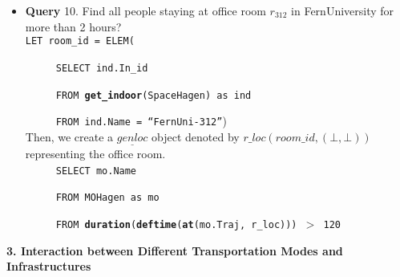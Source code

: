 \begin{itemize}
 \item \textbf{Query} 10. Find all people staying at office room $r_{312}$ in FernUniversity for more than 2 hours? \\

\texttt{LET room\_id = ELEM(} 

$\hspace{1cm}$ \texttt{SELECT ind.In\_id}

$\hspace{1cm}$ \texttt{FROM \textbf{get\_indoor}(SpaceHagen) as ind}

$\hspace{1cm}$ \texttt{FROM ind.Name = ``FernUni-312''}) \\

Then, we create a $\underline{genloc}$ object denoted by $r\_loc(room\_id,(\bot,\bot))$ representing the office room. \\ 


$\hspace{1cm}$ \texttt{SELECT mo.Name}

$\hspace{1cm}$ \texttt{FROM MOHagen as mo}

$\hspace{1cm}$ \texttt{FROM \textbf{duration}(\textbf{deftime}(\textbf{at}(mo.Traj, r\_loc))) $>$ 120}  \\

\end{itemize}



\textbf{3. Interaction between Different Transportation Modes and Infrastructures} \\

